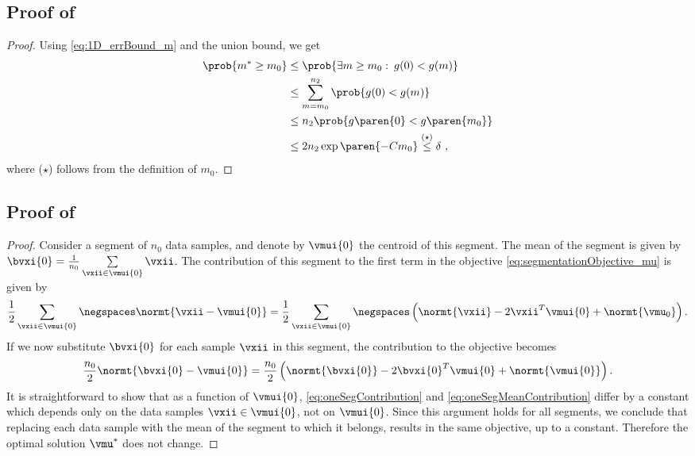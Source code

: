 \subsection{Proof of }\label{sec:proof:1D_errBound}
\begin{proof}
Using \eqref{eq:1D_errBound_m} and the union bound, we get
\begin{align*}
    \prob{m^*\geq m_0} &\leq \prob{\exists m\geq m_0:\:g(0)<g(m)} \\
    &\leq\sum_{m=m_0}^{n_2}\prob{g(0)<g(m)} \\
    &\leq n_2\prob{g\paren{0}<g\paren{m_0}} \\
    &\leq 2n_2\exp\paren{-Cm_0} \stackrel{(\star)}{\leq} \delta~,
\end{align*}
where ($\star$) follows from %
the definition of $m_0$.
\end{proof}\QED

\subsection{Proof of }\label{sec:proof_lem:replaceSamplesWithMean}
\begin{proof} Consider a segment of $n_0$ data samples, and denote by $\vmui{0}$ the centroid of this segment. The mean
of the segment is given by $\bvxi{0}=\frac{1}{n_0}\sum\limits_{\vxii\in\vmui{0}}\vxii$. The contribution of this segment to
the first term in the objective \eqref{eq:segmentationObjective_mu} is given by
\begin{equation}\label{eq:oneSegContribution}
\frac{1}{2}\sum\limits_{\vxii\in\vmui{0}}\negspaces\normt{\vxii-\vmui{0}}=
\frac{1}{2}\sum\limits_{\vxii\in\vmui{0}}\negspaces\left(\normt{\vxii}-2\vxii^T\vmui{0}+\normt{\vmu_0}\right).
\end{equation}
If we now substitute $\bvxi{0}$ for each sample $\vxii$ in this segment, the contribution to the objective becomes
\begin{equation}\label{eq:oneSegMeanContribution}
    \frac{n_0}{2}\normt{\bvxi{0}-\vmui{0}}=\frac{n_0}{2}\left(\normt{\bvxi{0}}-2\bvxi{0}^T\vmui{0}+\normt{\vmui{0}}\right).
\end{equation}
It is straightforward to show that as a function of $\vmui{0}$, \eqref{eq:oneSegContribution} and
\eqref{eq:oneSegMeanContribution} differ by a constant which depends only on the data samples $\vxii\in\vmui{0}$,
not on $\vmui{0}$. Since this argument holds for all segments, we conclude that replacing each data sample with the mean
of the segment to which it belongs, results in the same objective, up to a constant. Therefore the optimal solution $\vmu^*$
does not change.
\end{proof}\QED

